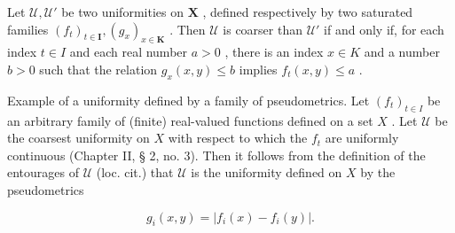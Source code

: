 Let \(\mathcal{U},\mathcal{U}'\) be two uniformities on \(\mathbf{X}\) , defined respectively by two saturated families \((f_{t})_{t\in \mathbf{I}},(g_{x})_{x\in \mathbf{K}}\) . Then \(\mathcal{U}\) is coarser than \(\mathcal{U}'\) if and only if, for each index \(t\in I\) and each real number \(a > 0\) , there is an index \(x\in K\) and a number \(b > 0\) such that the relation \(g_{x}(x,y)\leqslant b\) implies \(f_{t}(x,y)\leqslant a\) .

Example of a uniformity defined by a family of pseudometrics. Let \((f_{t})_{t\in I}\) be an arbitrary family of (finite) real-valued functions defined on a set \(X\) . Let \(\mathcal{U}\) be the coarsest uniformity on \(X\) with respect to which the \(f_{t}\) are uniformly continuous (Chapter II, § 2, no. 3). Then it follows from the definition of the entourages of \(\mathcal{U}\) (loc. cit.) that \(\mathcal{U}\) is the uniformity defined on \(X\) by the pseudometrics

\[
g _ {i} (x, y) = | f _ {i} (x) - f _ {i} (y) |.
\]

